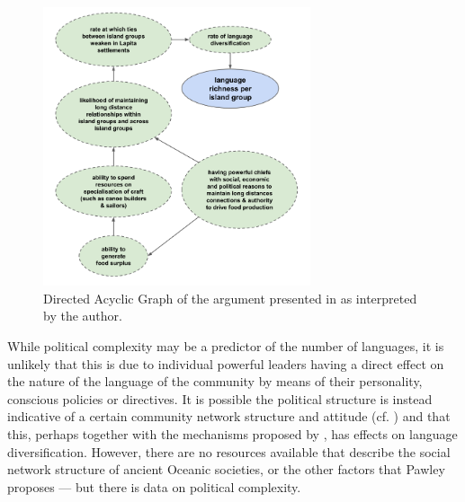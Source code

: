 \documentclass[unnumsec,webpdf,modern,medium]{oup-authoring-template}
\begin{document}
\begin{figure}[ht]
\centering
\includegraphics[width=0.7\textwidth]{Predicting_lgs_DAG_andy}
\caption{Directed Acyclic Graph of the argument presented in \cite{pawley2007} as interpreted by the author.}
\label{Predicting_lgs_DAG_andy}
\end{figure}

While political complexity may be a predictor of the number of languages, it is unlikely that this is due to individual powerful leaders having a direct effect on the nature of the language of the community by means of their personality, conscious policies or directives. It is possible the political structure is instead indicative of a certain community network structure and attitude (cf. \citet{watts_2018}) and that this, perhaps together with the mechanisms proposed by \citet{pawley2007}, has effects on language diversification. However, there are no resources available that describe the social network structure of ancient Oceanic societies, or the other factors that Pawley proposes --- but there is data on political complexity. 
\end{document}
